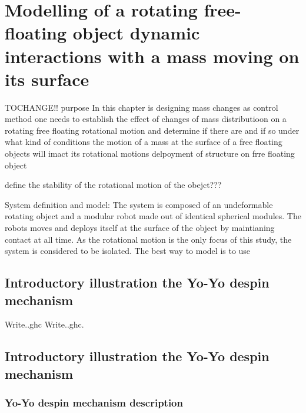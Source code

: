 

\chapter{Modelling of a rotating free-floating object dynamic interactions with a mass moving on its surface}
\label{ch:Stability study}
TOCHANGE!! purpose In this chapter is designing mass changes as control method one needs to establish the effect of changes of mass distributioon on a rotating free floating rotational motion and determine if there are and if so under what kind of conditions the motion of a mass at the surface of a free floating objects will imact its rotational motions
delpoyment of structure on frre floating object

define the stability of the rotational motion of the obejct???

System definition and model: The system is composed of an undeformable rotating object and a modular robot made out of identical spherical modules. The robots moves and deploys itself at the surface of the object by maintianing contact at all time. As the rotational motion is the only focus of this study, the system is considered to be isolated.
The best way to model is to use 

\section{Introductory illustration the Yo-Yo despin mechanism}
\label{Introductory illustration the Yo-Yo despin mechanism}




Write..\gls{ghc}
Write..\gls{ghc}.

\section{Introductory illustration the Yo-Yo despin mechanism}
\label{Introductory illustration the Yo-Yo despin mechanism}

\subsection{Yo-Yo despin mechanism description}
\label{Yo-Yo despin mechanism description}




